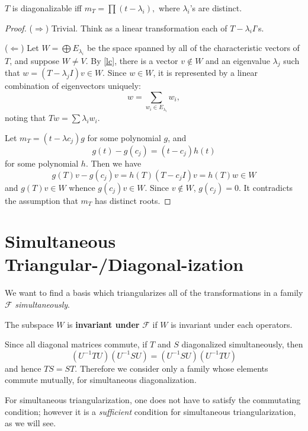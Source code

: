 \begin{theorem}$T$ is diagonalizable iff $m_T = \prod (t-\lambda_i),$ where $\lambda_i$'s are distinct.\end{theorem}
\begin{proof}
($\Longrightarrow$) Trivial. Think as a linear transformation each of $T-\lambda_i I$'s.

($\Longleftarrow$) Let $W=\bigoplus E_{\lambda_i}$ be the space spanned by all of the characteristic vectors of $T$, and suppose $W \ne V$. By \cref{lc}, there is a vector $v\not \in W$ and an eigenvalue $\lambda_j$ such that $w = (T-\lambda_j I)v \in W$. Since $w\in W$, it is represented by a linear combination of eigenvectors uniquely: $$w = \sum_{w_i \in  E_{\lambda_i}} w_i,$$noting that $T w = \sum \lambda_i w_i.$ 

Let $m_T = (t-\lambda c_j) g$ for some polynomial $g$, and $$g(t) - g(c_j) = (t - c_j)h(t)$$ for some polynomial $h$. Then we have $$g(T)v - g(c_j)v = h(T)(T-c_j I)v = h(T)w \in W$$ and $g(T)v \in W$ whence $g(c_j)v \in W.$ Since $v\not\in W$, $g(c_j) = 0.$ It contradicts the assumption that $m_T$ has distinct roots.
\end{proof}

\section{Simultaneous Triangular-/Diagonal-ization}
We want to find a basis which triangularizes all of the transformations in a family $\mathscr F$ \textit{simultaneously}.

The subspace $W$ is \textbf{invariant under} $ {\mathscr F}$ if $W$ is invariant under each operators.

Since all diagonal matrices commute, if $T$ and $S$ diagonalized simultaneously, then$$(U^{-1}TU)(U^{-1}SU) = (U^{-1}SU)(U^{-1}TU)$$ and hence $TS = ST.$ Therefore we consider only a family whose elements commute mutually, for simultaneous diagonalization.

For simultaneous triangularization, one does not have to satisfy the commutating condition; however it is a \textit{sufficient} condition for simultaneous triangularization, as we will see.

